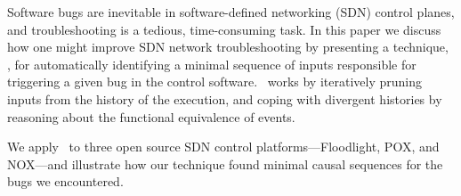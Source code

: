Software bugs are inevitable in software-defined networking (SDN) control planes,
and troubleshooting
is a tedious, time-consuming task.
In this paper we discuss how one might improve SDN
network troubleshooting by presenting a technique, \simulator,
for automatically identifying
a minimal sequence of inputs responsible for triggering a given bug in the
control software.
\Simulator~works by
iteratively pruning inputs from the history of the execution, and
coping with divergent histories by reasoning about the functional equivalence
of events.

We apply \simulator~to three open source SDN control
platforms---Floodlight, POX, and NOX---and
illustrate how our technique found minimal causal sequences for
the bugs we encountered.
